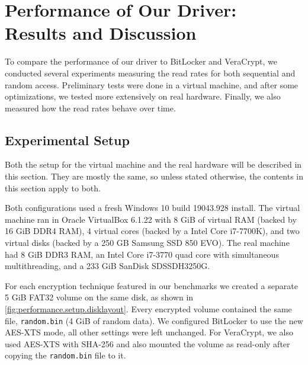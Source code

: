 \chapter{Performance of Our Driver: Results and Discussion}
\label{chap:performance}
To compare the performance of our driver to BitLocker and VeraCrypt, we conducted several experiments measuring the read rates for both sequential and random access. Preliminary tests were done in a virtual machine, and after some optimizations, we tested more extensively on real hardware. Finally, we also measured how the read rates behave over time.

\section{Experimental Setup}
\label{chap:performance.setup}
Both the setup for the virtual machine and the real hardware will be described in this section. They are mostly the same, so unless stated otherwise, the contents in this section apply to both.

Both configurations used a fresh Windows 10 build 19043.928 install. The virtual machine ran in Oracle VirtualBox 6.1.22 with 8 GiB of virtual RAM (backed by 16 GiB DDR4 RAM), 4 virtual cores (backed by a Intel Core i7-7700K), and two virtual disks (backed by a 250 GB Samsung SSD 850 EVO). The real machine had 8 GiB DDR3 RAM, an Intel Core i7-3770 quad core with simultaneous multithreading, and a 233 GiB SanDisk SDSSDH3250G.

For each encryption technique featured in our benchmarks we created a separate 5 GiB FAT32 volume on the same disk, as shown in \autoref{fig:performance.setup.disklayout}. Every encrypted volume contained the same file, \texttt{random.bin} (4 GiB of random data). We configured BitLocker to use the new AES-XTS mode, all other settings were left unchanged. For VeraCrypt, we also used AES-XTS with SHA-256 and also mounted the volume as read-only after copying the \texttt{random.bin} file to it.

